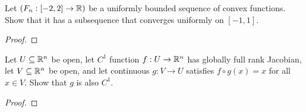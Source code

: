 \documentclass{report}
\begin{document}
\begin{question}{}{}
Let $(F_n:[-2,2]\rightarrow \mathbb{R})$ be a uniformly bounded sequence of convex functions. Show that it has a subsequence that converges uniformly on $[-1,1]$. 
\end{question}
\begin{proof}

\end{proof}
\begin{question}{}{}
Let $U\subseteq \mathbb{R}^n$ be open, let $C^1$ function $f:U\rightarrow \mathbb{R}^n$ has globally full rank Jacobian, let $V \subseteq \mathbb{R}^n$ be open, and let continuous $g:V\rightarrow U$ satisfies $f\circ g(x)=x$ for all $x\in V$. Show that $g$ is also $C^1$. 
\end{question}
\begin{proof}

\end{proof}
\end{document}
